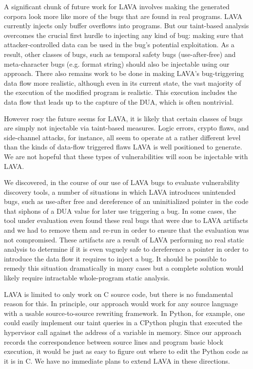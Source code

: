 
A significant chunk of future work for LAVA involves making the generated corpora look more like more of the bugs that are found in real programs. 
LAVA currently injects only buffer overflows into programs.
But our taint-based analysis overcomes the crucial first hurdle to injecting any kind of bug: making sure that attacker-controlled data can be used in the bug's potential exploitation. 
As a result, other classes of bugs, such as temporal safety bugs (use-after-free) and meta-character bugs (e.g. format string) should also be injectable using our approach. 
There also remains work to be done in making LAVA's bug-triggering data flow more realistic, although even in its current state, the vast majority of the execution of the modified program is realistic. 
This execution includes the data flow that leads up to the capture of the DUA, which is often nontrivial.

However rosy the future seems for LAVA, it is likely that certain classes of bugs are simply not injectable via taint-based measures.
Logic errors, crypto flaws, and side-channel attacks, for instance, all seem to operate at a rather different level than the kinds of data-flow triggered flaws LAVA is well positioned to generate.
We are not hopeful that these types of vulnerabilities will soon be injectable with LAVA. 

We discovered, in the course of our use of LAVA bugs to evaluate vulnerability discovery tools, a number of situations in which LAVA introduces unintended bugs, such as use-after free and dereference of an uninitialized pointer in the code that siphons of a DUA value for later use triggering a bug.  
In some cases, the tool under evaluation even found these real bugs that were due to LAVA artifacts and we had to remove them and re-run in order to ensure that the evaluation was not compromised. 
These artifacts are a result of LAVA performing no real static analysis to determine if it is even vaguely safe to dereference a pointer in order to introduce the data flow it requires to inject a bug.
It should be possible to remedy this situation dramatically in many cases but a complete solution would likely require intractable whole-program static analysis.  

LAVA is limited to only work on C source code, but there is no fundamental reason for this.
In principle, our approach would work for any source language with a usable source-to-source rewriting framework. 
In Python, for example, one could easily implement our taint queries in a CPython plugin that executed the hypervisor call against the address of a variable in memory. 
Since our approach records the correspondence between source lines and program basic block execution, it would be just as easy to figure out where to edit the Python code as it is in C.
We have no immediate plans to extend LAVA in these directions.

